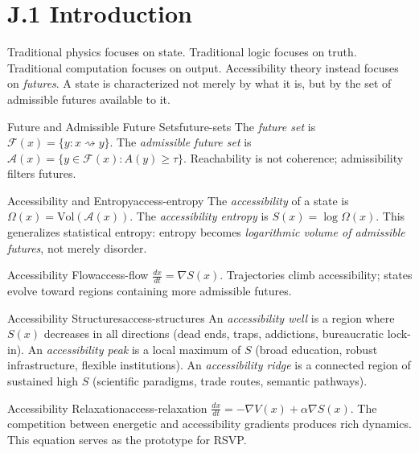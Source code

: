 
\section*{J.1 Introduction}

Traditional physics focuses on state. Traditional logic focuses on truth.
Traditional computation focuses on output. Accessibility theory instead
focuses on \emph{futures}. A state is characterized not merely by what it is,
but by the set of admissible futures available to it.

\begin{definition}{Future and Admissible Future Sets}{future-sets}
  The \emph{future set} is $\mathcal{F}(x) = \{y : x \rightsquigarrow y\}$.
  The \emph{admissible future set} is
  $\mathcal{A}(x) = \{y \in \mathcal{F}(x) : A(y) \geq \tau\}$.
  Reachability is not coherence; admissibility filters futures.
\end{definition}

\begin{definition}{Accessibility and Entropy}{access-entropy}
  The \emph{accessibility} of a state is $\Omega(x) = \mathrm{Vol}(\mathcal{A}(x))$.
  The \emph{accessibility entropy} is $S(x) = \log \Omega(x)$.
  This generalizes statistical entropy: entropy becomes
  \emph{logarithmic volume of admissible futures}, not merely disorder.
\end{definition}

\begin{definition}{Accessibility Flow}{access-flow}
  $\frac{dx}{dt} = \nabla S(x)$.
  Trajectories climb accessibility; states evolve toward regions
  containing more admissible futures.
\end{definition}

\begin{definition}{Accessibility Structures}{access-structures}
  An \emph{accessibility well} is a region where $S(x)$ decreases in all
  directions (dead ends, traps, addictions, bureaucratic lock-in).
  An \emph{accessibility peak} is a local maximum of $S$
  (broad education, robust infrastructure, flexible institutions).
  An \emph{accessibility ridge} is a connected region of sustained high $S$
  (scientific paradigms, trade routes, semantic pathways).
\end{definition}

\begin{definition}{Accessibility Relaxation}{access-relaxation}
  $\frac{dx}{dt} = -\nabla V(x) + \alpha \nabla S(x)$.
  The competition between energetic and accessibility gradients produces
  rich dynamics. This equation serves as the prototype for RSVP.
\end{definition}

